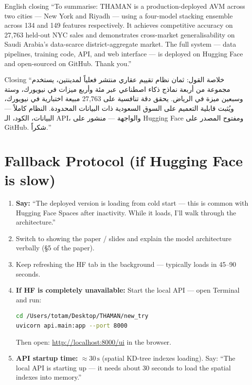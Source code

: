 \documentclass[11pt, a4paper, twoside]{article}
\begin{document}
\begin{narration}{English closing}
``To summarise: THAMAN is a production-deployed AVM across two cities --- New
York and Riyadh --- using a four-model stacking ensemble across 134 and 149
features respectively. It achieves competitive accuracy on 27,763 held-out
NYC sales and demonstrates cross-market generalisability on Saudi Arabia's
data-scarce district-aggregate market. The full system --- data pipelines,
training code, API, and web interface --- is deployed on Hugging Face and
open-sourced on GitHub. Thank you.''
\end{narration}

\begin{arabic}{Closing}
``خلاصة القول: ثمان نظام تقييم عقاري منتشر فعلياً لمدينتين، يستخدم مجموعة من
أربعة نماذج ذكاء اصطناعي عبر مئة وأربع ميزات في نيويورك، وستة وسبعين ميزة في
الرياض. يحقق دقة تنافسية على 27,763 مبيعة اختبارية في نيويورك، ويُثبت قابلية
التعميم على السوق السعودية ذات البيانات المحدودة. النظام كاملاً --- البيانات،
الكود، الـ API، والواجهة --- منشور على Hugging Face ومفتوح المصدر على GitHub.
شكراً.''
\end{arabic}

\section{Fallback Protocol (if Hugging Face is slow)}
\label{sec:fallback}

\begin{fallback}
\begin{enumerate}
  \item \textbf{Say:} ``The deployed version is loading from cold start ---
        this is common with Hugging Face Spaces after inactivity. While it
        loads, I'll walk through the architecture.''
  \item Switch to showing the paper / slides and explain the model architecture
        verbally (\S5 of the paper).
  \item Keep refreshing the HF tab in the background --- typically loads in
        45--90 seconds.
  \item \textbf{If HF is completely unavailable:} Start the local API ---
        open Terminal and run:
        \begin{lstlisting}[language=bash]
cd /Users/totam/Desktop/THAMAN/new_try
uvicorn api.main:app --port 8000
        \end{lstlisting}
        Then open: \url{http://localhost:8000/ui} in the browser.
  \item \textbf{API startup time:} $\approx 30\,\text{s}$ (spatial KD-tree
        indexes loading). Say: ``The local API is starting up --- it needs about
        30 seconds to load the spatial indexes into memory.''
\end{enumerate}
\end{fallback}
\end{document}
